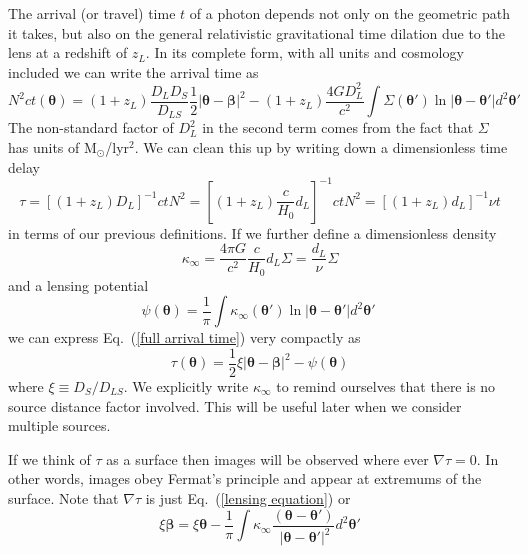 \documentclass[galley]{mn2e}
\newcommand{\Msun}{\ensuremath{\mathrm{M}_\odot}}
\newcommand{\eqnref}[1] {Eq.~(\ref{#1})}
\renewcommand{\vec}[1]{\ensuremath{\boldsymbol{#1}}}
\begin{document}
The arrival (or travel) time $t$ of a photon depends not only on the geometric
path it takes, but also on the general relativistic gravitational time dilation
due to the lens at a redshift of $z_L$.  In its complete form, with all units
and cosmology included we can write the arrival time as
%
\begin{equation}
N^2ct(\vec\theta) = (1+z_L)\frac{D_{L}D_{S}}{D_{LS}}\frac12 |\vec\theta - \vec\beta|^2 - (1+z_L)\frac{4GD_{L}^2}{c^2}\int \Sigma(\vec\theta') \ln |\vec\theta-\vec\theta'| d^2\vec\theta'
\label{full arrival time}
\end{equation}
%
The non-standard factor of $D_L^2$ in the second term comes from the fact that $\Sigma$
has units of \Msun/lyr$^2$. We can clean this up by writing down a dimensionless time
delay 
%
\begin{equation}
\tau = \left[(1+z_L)D_{L}\right]^{-1}ctN^2 = \left[ (1+z_L) \frac{c}{H_0}d_L\right]^{-1}ctN^2 = \left[ (1+z_L) d_L\right]^{-1}\nu t
\label{tau}
\end{equation}
%
in terms of our previous definitions. If we
further define a dimensionless density
%
\begin{equation}
\kappa_\infty = \frac{4\pi G}{c^2}\frac{c}{H_0}d_L\Sigma
              = \frac{d_L}{\nu}\Sigma
\end{equation}
%
and a lensing potential
%
\begin{equation}
\psi(\vec\theta) = \frac1\pi \int \kappa_\infty(\vec\theta') \ln|\vec\theta - \vec\theta'| d^2\vec\theta'\
\label{lensing potential}
\end{equation}
%
we can express \eqnref{full arrival time} very compactly as
%
\begin{equation}
\tau(\vec\theta) = \frac12 \xi |\vec\theta-\vec\beta|^2 - \psi(\vec\theta)
\label{arrival time}
\end{equation}
%
where $\xi \equiv D_{S}/D_{LS}$. We explicitly write $\kappa_\infty$ to remind ourselves
that there is no source distance factor involved. This will be useful later when we consider
multiple sources.

If we think of $\tau$ as a surface then images will be observed where ever
$\nabla \tau = 0$. In other words, images obey Fermat's principle and appear at
extremums of the surface. Note that $\nabla \tau$ is just \eqnref{lensing equation} or
\begin{equation}
  \xi \vec\beta = \xi \vec\theta - \frac 1\pi\int \kappa_\infty\frac{(\vec\theta - \vec\theta')}{\ |\vec\theta - \vec\theta'|^2}d^2\vec\theta'
\end{equation}
\end{document}
